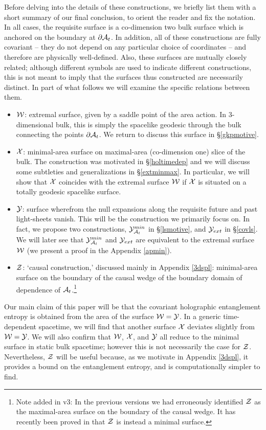 \documentclass[12pt]{article}
\def\sec#1{\S \;\ref{#1}}
\def\App#1{Appendix \ref{#1}}
\def\p{\partial}
\def\CA{{\cal A}}
\def\CW{{\cal W}}
\def\CX{{\cal X}}
\def\CY{{\cal Y}}
\def\CZ{{\cal Z}}
\def\p{\partial}
\def\p{\partial}
\def\Gms{\CW}
\def\Lms{\CY}
\def\Xms{\CX}
\def\Cms{\CZ}
\def\rA{\CA}
\def\brA{\p \CA}
\begin{document}
Before delving into the details of these constructions, we briefly
list them with a short summary of our final conclusion, to orient
the reader and fix the notation. In all cases, the
requisite surface is a co-dimension two bulk surface which is
anchored on the boundary at $\brA_t$.
  In addition, all of these constructions are fully covariant -- they
   do not depend on any particular choice of coordinates -- and therefore
    are physically well-defined.  Also, these surfaces are mutually closely
    related; although different symbols are used to indicate different constructions,
     this is not meant to imply that the surfaces thus constructed are necessarily distinct.
      In part of what follows we will examine the specific relations between them.
\begin{itemize}
\item
$\Gms$: extremal surface, given by a saddle point of the area action.
In 3-dimensional bulk, this is simply the spacelike geodesic through the
bulk connecting the points $\brA_t$.  We return to discuss this surface in \sec{gkpmotive}.
\item
$\Xms$: minimal-area surface on maximal-area (co-dimension one)
slice of the bulk.  The construction was motivated in
\sec{holtimedep} and we will discuss some subtleties and
generalizations in \sec{extminmax}. In particular, we will show that
$\Xms$ coincides with the extremal surface $\Gms$ if $\Xms$ is
situated on a totally geodesic spacelike surface.
\item
$\Lms$: surface wherefrom the null expansions along the requisite
future and past light-sheets vanish. This will be the construction
we primarily focus on.  In fact, we propose two constructions,
$\Lms_{\rA_t}^{min}$ in \sec{lsmotive}, and $\Lms_{ext}$ in
\sec{covls}. We will later see that $\Lms_{\rA_t}^{min}$ and
$\Lms_{ext}$ are equivalent to the extremal surface $\Gms$ (we
present a proof in the \App{apmin}).
\item
$\Cms$: `causal construction,' discussed mainly in \App{3dspl}: minimal-area surface on the boundary
of the causal wedge of the boundary domain of dependence of $\rA_t$.\footnote{Note added in v3: In the previous versions we had erroneously identified $\Cms$ as the maximal-area surface on the boundary of the causal wedge. It has recently been proved in \cite{Hubeny:2012wa} that $\Cms$ is instead a minimal surface.\label{v3addition}} \end{itemize}

Our main claim of this paper will be that the covariant holographic
entanglement entropy is obtained from the area of the surface
$\Gms=\Lms$. In a generic time-dependent spacetime, we will find
that another surface $\Xms$ deviates slightly from $\Gms=\Lms$. We
will also confirm that $\Gms$, $\Xms$, and $\Lms$ all reduce to the
minimal surface in static bulk spacetime; however this is not
necessarily the case for $\Cms$. Nevertheless, $\Cms$ will be useful
because, as we motivate in \App{3dspl}, it provides a bound on the
entanglement entropy, and is computationally simpler to
find.
\end{document}
